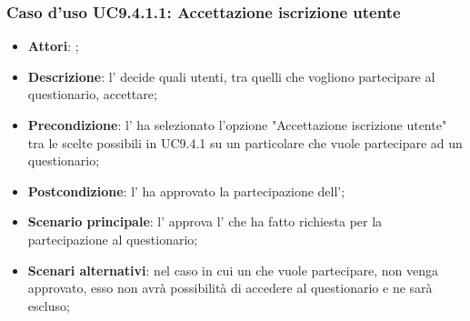 			 \subsubsection{Caso d'uso UC9.4.1.1: Accettazione iscrizione utente}
			 \label{UC9.4.1.1}
			 \begin{itemize}
			 	\item \textbf{Attori}: \uaupro{};
			 	\item \textbf{Descrizione}: l'\uaupro{} decide quali utenti, tra quelli che vogliono partecipare al questionario, accettare; 
			 	\item \textbf{Precondizione}: l'\uaupro{} ha selezionato l'opzione "Accettazione iscrizione utente" tra le scelte possibili in UC9.4.1 su un particolare \uaupro{} che vuole partecipare ad un questionario;
			 	\item \textbf{Postcondizione}: l'\uaupro{} ha approvato la partecipazione dell'\uaupro{};
			 	\item \textbf{Scenario principale}: l'\uaupro{} approva l'\uaupro{} che ha fatto richiesta per la partecipazione al questionario; 
			 	\item \textbf{Scenari alternativi}: nel caso in cui un \uaupro{} che vuole partecipare, non venga approvato, esso non avrà possibilità di accedere al questionario e ne sarà escluso;
			 \end{itemize}
			
				